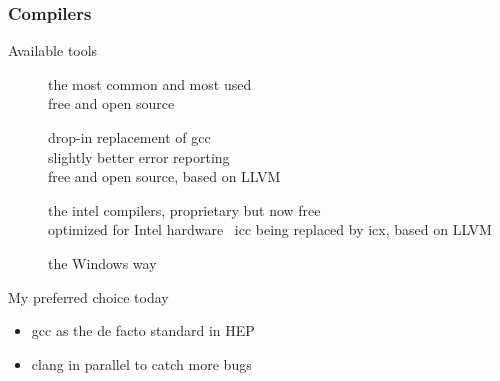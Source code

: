 \begin{frame}[fragile]
  \frametitle{Compilers}
  \begin{block}{Available tools}
    \begin{description}
    \item[\href{http://gcc.gnu.org/}{}]
        the most common and most used\\
        free and open source
    \item[\href{http://clang.llvm.org/}{}]
        drop-in replacement of gcc \\
        slightly better error reporting \\
        free and open source, based on LLVM
    \item[\href{https://www.intel.com/content/www/us/en/developer/tools/oneapi/dpc-compiler.html\#gs.dyllp0}{ }]
        the intel compilers, proprietary but now free \\
        optimized for Intel hardware \
        icc being replaced by icx, based on LLVM
    \item[\href{http://www.microsoft.com/}{}]
      the Windows way
    \end{description}
  \end{block}
  \begin{alertblock}{My preferred choice today}
    \begin{itemize}
      \item \alert{gcc} as the de facto standard in HEP
      \item \hspace{0pt}\alert{clang} in parallel to catch more bugs
    \end{itemize}
  \end{alertblock}
\end{frame}

